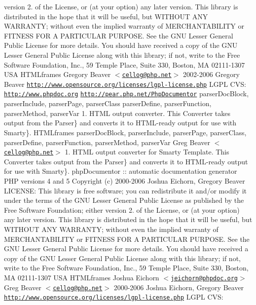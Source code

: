 version 2. of the \-License, or (at your option) any later version.  \-This library is distributed in the hope that it will be useful, but \-W\-I\-T\-H\-O\-U\-T \-A\-N\-Y \-W\-A\-R\-R\-A\-N\-T\-Y; without even the implied warranty of \-M\-E\-R\-C\-H\-A\-N\-T\-A\-B\-I\-L\-I\-T\-Y or \-F\-I\-T\-N\-E\-S\-S \-F\-O\-R \-A \-P\-A\-R\-T\-I\-C\-U\-L\-A\-R \-P\-U\-R\-P\-O\-S\-E. \-See the \-G\-N\-U \-Lesser \-General \-Public \-License for more details.  \-You should have received a copy of the \-G\-N\-U \-Lesser \-General \-Public \-License along with this library; if not, write to the \-Free \-Software \-Foundation, \-Inc., 59 \-Temple \-Place, \-Suite 330, \-Boston, \-M\-A 02111-\/1307 \-U\-S\-A   \-H\-T\-M\-Lframes  \-Gregory \-Beaver $<$\href{mailto:cellog@php.net}{\tt cellog@php.\-net}$>$  2002-\/2006 \-Gregory \-Beaver  \href{http://www.opensource.org/licenses/lgpl-license.php}{\tt http\-://www.\-opensource.\-org/licenses/lgpl-\/license.\-php} \-L\-G\-P\-L  \-C\-V\-S\-:    \href{http://www.phpdoc.org}{\tt http\-://www.\-phpdoc.\-org}  \href{http://pear.php.net/PhpDocumentor}{\tt http\-://pear.\-php.\-net/\-Php\-Documentor}  parser\-Doc\-Block, parser\-Include, parser\-Page, parser\-Class  parser\-Define, parser\-Function, parser\-Method, parser\-Var  1.  \-H\-T\-M\-L output converter. \-This \-Converter takes output from the  \-Parser\} and converts it to \-H\-T\-M\-L-\/ready output for use with  \-Smarty\}.   \-H\-T\-M\-Lframes  parser\-Doc\-Block, parser\-Include, parser\-Page, parser\-Class, parser\-Define, parser\-Function, parser\-Method, parser\-Var  \-Greg \-Beaver $<$\href{mailto:cellog@php.net}{\tt cellog@php.\-net}$>$  1.    \-H\-T\-M\-L output converter for \-Smarty \-Template. \-This \-Converter takes output from the  \-Parser\} and converts it to \-H\-T\-M\-L-\/ready output for use with  \-Smarty\}.  php\-Documentor \-:\-: automatic documentation generator  \-P\-H\-P versions 4 and 5  \-Copyright (c) 2000-\/2006 \-Joshua \-Eichorn, \-Gregory \-Beaver  \-L\-I\-C\-E\-N\-S\-E\-:  \-This library is free software; you can redistribute it and/or modify it under the terms of the \-G\-N\-U \-Lesser \-General \-Public \-License as published by the \-Free \-Software \-Foundation; either version 2. of the \-License, or (at your option) any later version.  \-This library is distributed in the hope that it will be useful, but \-W\-I\-T\-H\-O\-U\-T \-A\-N\-Y \-W\-A\-R\-R\-A\-N\-T\-Y; without even the implied warranty of \-M\-E\-R\-C\-H\-A\-N\-T\-A\-B\-I\-L\-I\-T\-Y or \-F\-I\-T\-N\-E\-S\-S \-F\-O\-R \-A \-P\-A\-R\-T\-I\-C\-U\-L\-A\-R \-P\-U\-R\-P\-O\-S\-E. \-See the \-G\-N\-U \-Lesser \-General \-Public \-License for more details.  \-You should have received a copy of the \-G\-N\-U \-Lesser \-General \-Public \-License along with this library; if not, write to the \-Free \-Software \-Foundation, \-Inc., 59 \-Temple \-Place, \-Suite 330, \-Boston, \-M\-A 02111-\/1307 \-U\-S\-A   \-H\-T\-M\-Lframes  \-Joshua \-Eichorn $<$\href{mailto:jeichorn@phpdoc.org}{\tt jeichorn@phpdoc.\-org}$>$  \-Greg \-Beaver $<$\href{mailto:cellog@php.net}{\tt cellog@php.\-net}$>$  2000-\/2006 \-Joshua \-Eichorn, \-Gregory \-Beaver  \href{http://www.opensource.org/licenses/lgpl-license.php}{\tt http\-://www.\-opensource.\-org/licenses/lgpl-\/license.\-php} \-L\-G\-P\-L  \-C\-V\-S\-:    